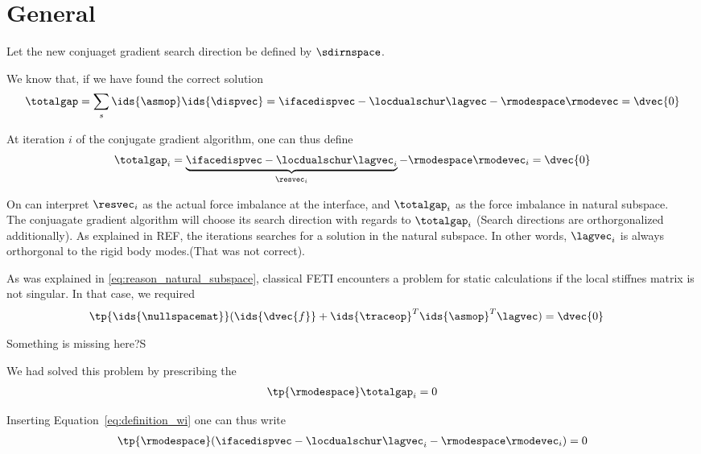 \documentclass[preview]{standalone} %
\begin{document}
\section{General}
Let the new conjuaget gradient search direction be defined by $\sdirnspace$.

We know that, if we have found the correct solution
\begin{align}
\totalgap=\sum_s \ids{\asmop}\ids{\dispvec}=\ifacedispvec-\locdualschur \lagvec - \rmodespace \rmodevec = \dvec{0}
\end{align}

At iteration $i$ of the conjugate gradient algorithm, one can thus define
\begin{align}
\totalgap_i=\underbrace{\ifacedispvec-\locdualschur \lagvec_i}_{\resvec_i} - \rmodespace \rmodevec_i = \dvec{0}
\label{eq:definition_wi}
\end{align}

On can interpret $\resvec_i$ as the actual force imbalance at the interface, and $\totalgap_i$ as the force imbalance in natural subspace.\\

The conjuagate gradient algorithm will choose its search direction with regards to $\totalgap_i$ (Search directions are orthorgonalized additionally). As explained in REF, the iterations searches for a solution in the natural subspace. In other words, $\lagvec_i$ is always orthorgonal to the rigid body modes.(That was not correct).

As was explained in \eqref{eq:reason_natural_subspace}, classical FETI encounters a problem for static calculations if the local stiffnes matrix is not singular. In that case, we required
\begin{align}
&\tp{\ids{\nullspacemat}}(\ids{\dvec{f}}+{\ids{\traceop}}^T {\ids{\asmop}}^T \lagvec)=\dvec{0}%
\end{align}


Something is missing here?S

We had solved this problem by prescribing the
\begin{align}
\tp{\rmodespace} \totalgap_i =0
\label{eq:orthogonality_natural_subspace}
\end{align}

Inserting Equation~\eqref{eq:definition_wi} one can thus write
\begin{align}
\tp{\rmodespace} (\ifacedispvec-\locdualschur \lagvec_i - \rmodespace \rmodevec_i ) =0
\end{align}
\end{document}
